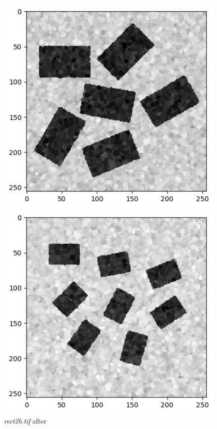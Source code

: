 \documentclass[runningheads]{llncs}
\begin{document}
\begin{figure}[h!]
\begin{minipage}[h]{0.47\linewidth}
\begin{center}
\includegraphics[width=1\linewidth]{Report/Result_Images/image_kb6.png} 
\caption{\emph{rect2b.tif} after}
\label{kb6-Kuwahara and Kernel 5}
\end{center}
\end{minipage}
\vfill
\vspace{0.2 cm}
\begin{minipage}[h]{0.47\linewidth}
\begin{center}
\includegraphics[width=1\linewidth]{Report/Result_Images/image_kb7.png} 

\end{center}
\end{minipage}
\end{figure}
\end{document}
